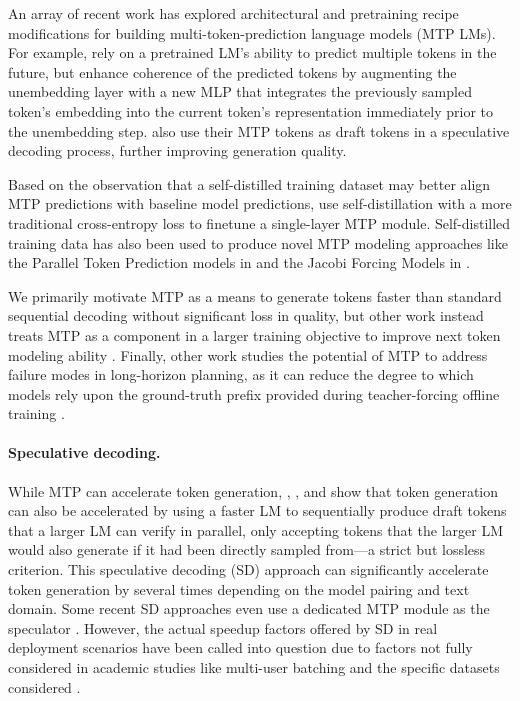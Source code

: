 \documentclass{article}
\theoremstyle{plain}
\theoremstyle{definition}
\theoremstyle{remark}
\begin{document}
An array of recent work has explored architectural and pretraining recipe modifications for building multi-token-prediction language models (MTP LMs). 
For example, \citet{samragh2025your} rely on a pretrained LM's ability to predict multiple tokens in the future, but enhance coherence of the predicted tokens by augmenting the unembedding layer with a new MLP that integrates the previously sampled token's embedding into the current token's representation immediately prior to the unembedding step.
\citet{samragh2025your} also use their MTP tokens as draft tokens in a speculative decoding process, further improving generation quality. 

Based on the observation that a self-distilled training dataset may better align MTP predictions with baseline model predictions, \citet{cai2025fastmtp} use self-distillation with a more traditional cross-entropy loss to finetune a single-layer MTP module. Self-distilled training data has also been used to produce novel MTP modeling approaches like the Parallel Token Prediction models in \citet{draxler2025parallel} and the Jacobi Forcing Models in \citet{hu2025fast}.

We primarily motivate MTP as a means to generate tokens faster than standard sequential decoding without significant loss in quality, but other work instead treats MTP as a component in a larger training objective to improve next token modeling ability \citep{liu2024deepseek}. Finally, other work studies the potential of MTP to address failure modes in long-horizon planning, as it can reduce the degree to which models rely upon the ground-truth prefix provided during teacher-forcing offline training \citep{bachmann2024pitfalls,mahajan2025beyond}. 

\paragraph{Speculative decoding.} While MTP can accelerate token generation, \citet{leviathan2023fast},  \citet{chen2023accelerating}, and \citet{li2025eagle} show that token generation can also be accelerated by using a faster LM to sequentially produce draft tokens that a larger LM can verify in parallel, only accepting tokens that the larger LM would also generate if it had been directly sampled from---a strict but lossless criterion.
This speculative decoding (SD) approach can significantly accelerate token generation by several times depending on the model pairing and text domain. Some recent SD approaches even use a dedicated MTP module as the speculator \citep{cai2024medusa}. However, the actual speedup factors offered by SD in real deployment scenarios have been called into question due to factors not fully considered in academic studies like multi-user batching and the specific datasets considered \citep{liu2025speculative}. 
\end{document}
